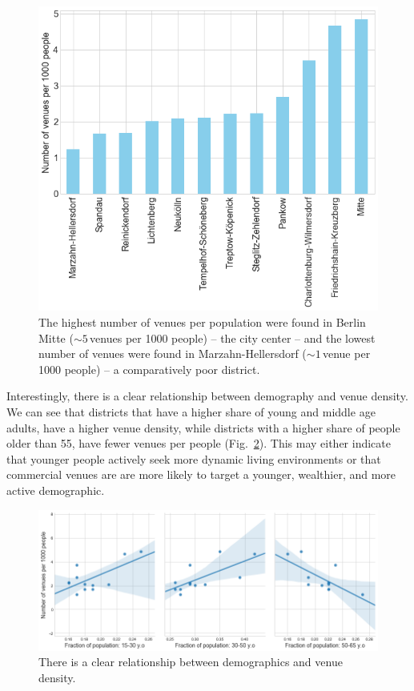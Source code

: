\documentclass[letter]{scrartcl}
\begin{document}
\begin{figure}[h!]
\centering
\includegraphics[width=12cm]{../Figures/VenueDensity.PNG}
\caption{The highest number of venues per population were found in Berlin Mitte ($\sim 5$\,venues per 1000 people) -- the city center --  and the lowest number of venues were found in Marzahn-Hellersdorf ($\sim 1$\,venue per 1000 people) -- a comparatively poor district.}\label{fig:VenDens}
\end{figure}

\clearpage 

Interestingly, there is a clear relationship between demography and venue density. We can see that districts that have a higher share of young and middle age adults, have a higher venue density, while  districts with a higher share of people older than 55, have fewer venues per people (Fig.~\ref{fig:PopVsVen}). This may either indicate that younger people actively seek more dynamic living environments or that commercial venues are are more likely to target a younger, wealthier, and more active demographic.

\begin{figure}[h!]
\centering
\includegraphics[width=12cm]{../Figures/PopVsVen.PNG}
\caption{There is a clear relationship between demographics and venue density.}\label{fig:PopVsVen}
\end{figure}
\end{document}
